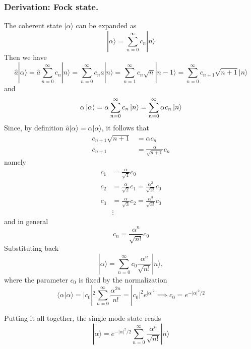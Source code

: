 \documentclass[../../../main.tex]{subfiles}
\begin{document}
\subsubsection{Derivation: Fock state.}
The coherent state $|\alpha\rangle$ can be expanded as
\begin{equation*}
  |\alpha\rangle = \sum_{n=0}^{\infty} c_n |n\rangle
\end{equation*}
Then we have
\begin{equation*}
  \hat{a} |\alpha\rangle = \hat{a} \sum_{n=0}^{\infty} c_n |n\rangle = \sum_{n=0}^{\infty} c_n \hat{a}|n\rangle = \sum_{n=1}^{\infty} c_n \sqrt{n}|n-1\rangle = \sum_{n=0}^{\infty} c_{n+1}\sqrt{n+1} |n\rangle
\end{equation*}
and
\begin{equation*}
  \alpha \ket{\alpha} =  \alpha \sum_{n=0 }^{\infty}c_n \ket{n}= \sum_{n=0 }^{\infty }\alpha c_n \ket{n}
\end{equation*}
Since, by definition $  \hat{a} |\alpha\rangle = \alpha |\alpha\rangle$, it follows that
\begin{align*}
  c_{n+1} \sqrt{n+1} & = \alpha c_n                    \\
  c_{n+1}            & = \frac{\alpha}{\sqrt{n+1}} c_n
\end{align*}
namely
\begin{align*}
  c_1 & =  \frac{\alpha}{\sqrt{1}} c_0                                 \\
  c_2 & =\frac{\alpha }{\sqrt{2}}c_1= \frac{\alpha^2}{\sqrt{2!}} c_0   \\
  c_3 & =  \frac{\alpha }{\sqrt{3 }}c_2=\frac{\alpha^3}{\sqrt{3!}} c_0 \\
      & \vdots
\end{align*}
and in general
\begin{equation*}
  c_n = \frac{\alpha^n}{\sqrt{n!}} c_0
\end{equation*}
Substituting back
\begin{equation*}
  |\alpha\rangle = \sum_{n=0}^{\infty} c_0 \frac{\alpha^n}{\sqrt{n!}} |n\rangle ,
\end{equation*}
where the parameter $c_0$ is fixed by the normalization
\begin{equation*}
  \langle \alpha | \alpha \rangle = |c_0|^2 \sum_{n=0}^{\infty} \frac{\alpha^{2n}}{n!} = |c_0|^2 e^{|\alpha|^2}\implies c_0 = e^{-|\alpha|^2/2}
\end{equation*}

Putting it all together, the single mode state reads
\begin{equation*}
  |\alpha\rangle = e^{-|\alpha|^2/2} \sum_{n=0}^{\infty} \frac{\alpha^n}{\sqrt{n!}} |n\rangle
\end{equation*}
\end{document}
